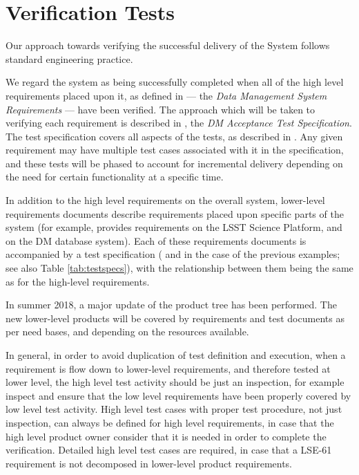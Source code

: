 \section{Verification Tests \label{sect:approach}}

Our approach towards verifying the successful delivery of the \product{} System follows standard engineering practice.

We regard the system as being successfully completed when all of the high level requirements placed upon it, as defined in  --- the \emph{Data Management System Requirements} --- have been verified.
The approach which will be taken to verifying each requirement is described in , the \emph{DM Acceptance Test Specification}.
The test specification covers all aspects of the tests, as described in .
Any given requirement may have multiple test cases associated with it in the specification, and these tests will be phased to account for incremental delivery depending on the need for certain functionality at a specific time.

In addition to the high level requirements on the overall \product{} system, lower-level requirements documents describe requirements placed upon specific parts of the system (for example,  provides requirements on the LSST Science Platform, and  on the DM database system).
Each of these requirements documents is accompanied by a test specification ( and  in the case of the previous examples; see also Table \ref{tab:testspecs}), with the relationship between them being the same as for the high-level requirements.

In summer 2018, a major update of the \product{} product tree has been performed. The new lower-level products will be covered by requirements and test documents as per need bases, and depending on the resources available.

In general, in order to avoid duplication of test definition and execution, when a requirement is flow down to lower-level requirements, and therefore tested at lower level, the high level test activity should be just an inspection, for example inspect and ensure that the low level requirements have been properly covered by low level test activity.
High level test cases with proper test procedure, not just inspection, can always be defined for high level requirements, in case that the high level product owner consider that it is needed in order to complete the verification.
Detailed high level test cases are required, in case that a LSE-61 requirement is not decomposed in lower-level product requirements.

